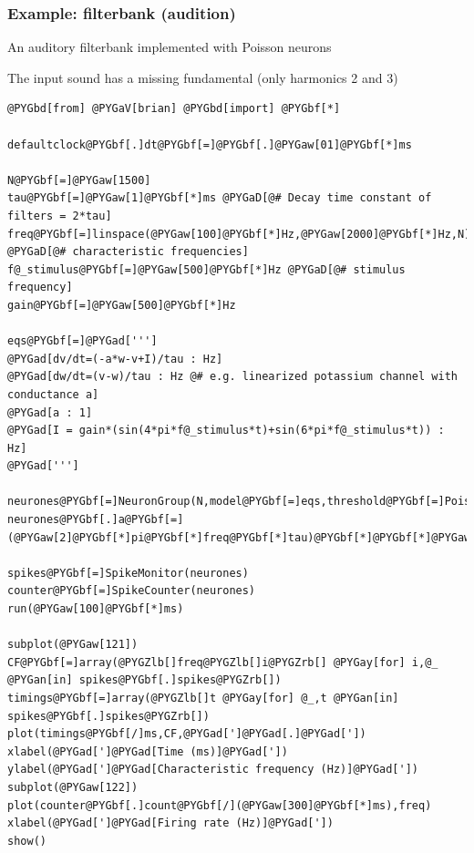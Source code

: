 \documentclass[letterpaper,10pt,english]{manual}
\begin{document}
\hypertarget{index-27}{}\subsubsection{Example: filterbank (audition)}

An auditory filterbank implemented with Poisson neurons

The input sound has a missing fundamental (only harmonics 2 and 3)

\begin{Verbatim}[commandchars=@\[\]]
@PYGbd[from] @PYGaV[brian] @PYGbd[import] @PYGbf[*]

defaultclock@PYGbf[.]dt@PYGbf[=]@PYGbf[.]@PYGaw[01]@PYGbf[*]ms

N@PYGbf[=]@PYGaw[1500]
tau@PYGbf[=]@PYGaw[1]@PYGbf[*]ms @PYGaD[@# Decay time constant of filters = 2*tau]
freq@PYGbf[=]linspace(@PYGaw[100]@PYGbf[*]Hz,@PYGaw[2000]@PYGbf[*]Hz,N) @PYGaD[@# characteristic frequencies]
f@_stimulus@PYGbf[=]@PYGaw[500]@PYGbf[*]Hz @PYGaD[@# stimulus frequency]
gain@PYGbf[=]@PYGaw[500]@PYGbf[*]Hz

eqs@PYGbf[=]@PYGad[''']
@PYGad[dv/dt=(-a*w-v+I)/tau : Hz]
@PYGad[dw/dt=(v-w)/tau : Hz @# e.g. linearized potassium channel with conductance a]
@PYGad[a : 1]
@PYGad[I = gain*(sin(4*pi*f@_stimulus*t)+sin(6*pi*f@_stimulus*t)) : Hz]
@PYGad[''']

neurones@PYGbf[=]NeuronGroup(N,model@PYGbf[=]eqs,threshold@PYGbf[=]PoissonThreshold())
neurones@PYGbf[.]a@PYGbf[=](@PYGaw[2]@PYGbf[*]pi@PYGbf[*]freq@PYGbf[*]tau)@PYGbf[*]@PYGbf[*]@PYGaw[2]

spikes@PYGbf[=]SpikeMonitor(neurones)
counter@PYGbf[=]SpikeCounter(neurones)
run(@PYGaw[100]@PYGbf[*]ms)

subplot(@PYGaw[121])
CF@PYGbf[=]array(@PYGZlb[]freq@PYGZlb[]i@PYGZrb[] @PYGay[for] i,@_ @PYGan[in] spikes@PYGbf[.]spikes@PYGZrb[])
timings@PYGbf[=]array(@PYGZlb[]t @PYGay[for] @_,t @PYGan[in] spikes@PYGbf[.]spikes@PYGZrb[])
plot(timings@PYGbf[/]ms,CF,@PYGad[']@PYGad[.]@PYGad['])
xlabel(@PYGad[']@PYGad[Time (ms)]@PYGad['])
ylabel(@PYGad[']@PYGad[Characteristic frequency (Hz)]@PYGad['])
subplot(@PYGaw[122])
plot(counter@PYGbf[.]count@PYGbf[/](@PYGaw[300]@PYGbf[*]ms),freq)
xlabel(@PYGad[']@PYGad[Firing rate (Hz)]@PYGad['])
show()
\end{Verbatim}

\resetcurrentobjects
\hypertarget{--doc-examples-audition_jeffress}{}
\end{document}

